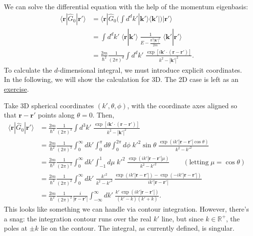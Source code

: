 \documentclass[pra,12pt]{revtex4}
\begin{document}
We can solve the differential equation with the help of the momentum
eigenbasis:
\begin{align}
  \langle\mathbf{r}|\hat{G}_0|\mathbf{r}'\rangle
  &= \langle\mathbf{r}|\hat{G}_0 \Big(\int d^dk' |\mathbf{k}'\rangle\langle\mathbf{k}'| \Big) |\mathbf{r}'\rangle \nonumber \\
  &= \int d^dk' \; \langle\mathbf{r}|\mathbf{k}'\rangle \;
  \frac{1}{E-\frac{\hbar^2|\mathbf{k}'|^2}{2m}} \;
  \langle\mathbf{k}'|\mathbf{r}'\rangle \nonumber \\
  &= \frac{2m}{\hbar^2} \frac{1}{(2\pi)^d} \int d^dk' \;
  \frac{\exp\left[i\mathbf{k}' \cdot
      (\mathbf{r}-\mathbf{r}')\right]}{k^2-|\mathbf{k}'|^2}.
  \label{rGr}
\end{align}
To calculate the $d$-dimensional integral, we must introduce explicit
coordinates.  In the following, we will show the calculation for 3D.
The 2D case is left as an \hyperref[ex:2dpropagator]{exercise}.

Take 3D spherical coordinates $(k',\theta,\phi)$, with the coordinate
axes aligned so that $\mathbf{r}-\mathbf{r}'$ points along $\theta=0$.
Then,
\begin{align}
  \langle\mathbf{r}|\hat{G}_0|\mathbf{r}'\rangle &= \frac{2m}{\hbar^2} \frac{1}{(2\pi)^3} \int d^3k' \; \frac{\exp\left[i\mathbf{k}'\cdot (\mathbf{r}-\mathbf{r}')\right]}{k^2-|\mathbf{k}'|^2} \nonumber \\
  &= \frac{2m}{\hbar^2} \frac{1}{(2\pi)^3} \int_0^\infty dk' \int_0^\pi d\theta \int_{0}^{2\pi} d\phi \;{k'}^{2}\sin\theta\; \frac{\displaystyle \exp\left(ik'|\mathbf{r}-\mathbf{r}'|\cos\theta\right)}{k^2-{k'}^2} \nonumber \\
  &= \frac{2m}{\hbar^2} \frac{1}{(2\pi)^2} \int_0^\infty dk' \int_{-1}^1 d\mu \;{k'}^2\; \frac{\displaystyle \exp\left(ik'|\mathbf{r}-\mathbf{r}'|\mu\right)}{k^2-{k'}^2} \qquad(\text{letting}\;\mu = \cos\theta) \nonumber \\
  &= \frac{2m}{\hbar^2} \frac{1}{(2\pi)^2} \int_0^\infty dk' \; \frac{ {k'}^2}{k^2-{k'}^2}\, \frac{\displaystyle \exp\left(ik'|\mathbf{r}-\mathbf{r}'|\right) - \exp\left(-ik'|\mathbf{r}-\mathbf{r}'|\right)}{ik'|\mathbf{r}-\mathbf{r}'|} \nonumber\\
  &= \frac{2m}{\hbar^2} \frac{1}{(2\pi)^2} \frac{i}{|\mathbf{r}-\mathbf{r}'|} \int_{-\infty}^\infty dk' \; \frac{\displaystyle k'\, \exp\left(ik'|\mathbf{r}-\mathbf{r}'|\right)}{(k' - k)(k'+k)}.
  \label{rGrintegrand}
\end{align}
This looks like something we can handle via contour integration.
However, there's a snag: the integration contour runs over the real
$k'$ line, but since $k \in \mathbb{R}^+$, the poles at $\pm k$ lie on
the contour.  The integral, as currently defined, is singular.
\end{document}
